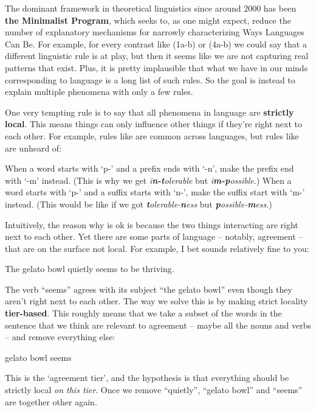 
The dominant framework in theoretical linguistics since around 2000 has been \textbf{the Minimalist Program}, which seeks to, as one might expect, reduce the number of explanatory mechanisms for narrowly characterizing Ways Languages Can Be. For example, for every contrast like (1a-b) or (4a-b) we could say that a different linguistic rule is at play, but then it seems like we are not capturing real patterns that exist. Plus, it is pretty implausible that what we have in our minds corresponding to language is a long list of such rules. So the goal is instead to explain multiple phenomena with only a few rules.

One very tempting rule is to say that all phenomena in language are \textbf{strictly local}. This means things can only influence other things if they're right next to each other. For example, rules like \Next[a] are common across languages, but rules like \Next[b] are unheard of:

\pex \a When a word starts with `p-' and a prefix ends with `-n', make the prefix end with `-m' instead. (This is why we get \textit{i\textbf{n-t}olerable} but \textit{i\textbf{m-p}ossible}.)
    \a When a word starts with `p-' and a suffix starts with `n-', make the suffix start with `m-' instead. (This would be like if we got \textit{\textbf{t}olerable-\textbf{n}ess} but \textit{\textbf{p}ossible-\textbf{m}ess}.)
\xe

Intuitively, the reason why \Last[a] is ok is because the two things interacting are right next to each other. Yet there are some parts of language -- notably, agreement -- that are on the surface not local. For example, I bet \Next{} sounds relatively fine to you:

\ex The gelato bowl quietly seems to be thriving. \xe

The verb ``seems'' agrees with its subject ``the gelato bowl'' even though they aren't right next to each other. The way we solve this is by making strict locality \textbf{tier-based}. This roughly means that we take a subset of the words in the sentence that we think are relevant to agreement -- maybe all the nouns and verbs -- and remove everything else:

\ex gelato bowl seems \xe

This is the `agreement tier', and the hypothesis is that everything should be strictly local \textit{on this tier}. Once we remove ``quietly'', ``gelato bowl'' and ``seems'' are together other again.

